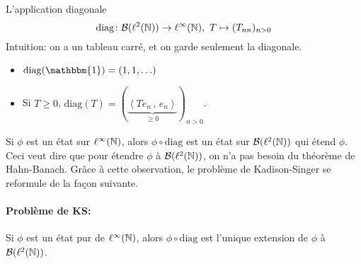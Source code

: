 \begin{defi}
  L'application diagonale 
  \[ \mathrm{diag} \colon \mathcal{B}(\ell^2(\mathbb{N})) \to \ell^\infty(\mathbb{N}),\ T \mapsto (T_{nn})_{n > 0} \]
  Intuition: on a un tableau carré, et on garde seulement la diagonale.
\end{defi}

\begin{exs}
  \begin{itemize}
    
  \item $\mathrm{diag}(\mathbbm{1}) = (1, 1, \ldots)$
  \item Si $T \geq 0$, $\mathrm{diag}(T) = \left( \underbrace{\left \langle Te_n\, ,\, e_n \right
        \rangle}_{\geq 0}  \right)_{n > 0}$.
  \end{itemize}
\end{exs}

Si $\phi$ est un état sur $\ell^\infty(\mathbb{N})$, alors $\phi \circ \mathrm{diag}$ est un état sur $\mathcal{B}(\ell^2(\mathbb{N}))$
qui étend $\phi$. Ceci veut dire que pour étendre $\phi$ à $\mathcal{B}(\ell^2(\mathbb{N}))$, on n'a pas besoin du théorème de
Hahn-Banach. Grâce à cette observation, le problème de Kadison-Singer se reformule de la façon suivante.

\paragraph{Problème de KS:} Si $\phi$ est un état pur de $\ell^\infty(\mathbb{N})$, alors $\phi \circ \mathrm{diag}$
est l'unique extension de $\phi$ à $\mathcal{B}(\ell^2(\mathbb{N}))$.




